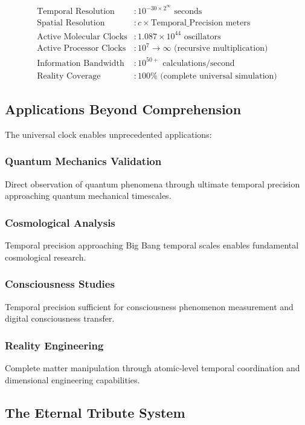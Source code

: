 \documentclass[12pt,a4paper]{article}
\begin{document}
\begin{align}
\text{Temporal Resolution} &: 10^{-30 \times 2^{\infty}} \text{ seconds} \\
\text{Spatial Resolution} &: c \times \text{Temporal\_Precision} \text{ meters} \\
\text{Active Molecular Clocks} &: 1.087 \times 10^{44} \text{ oscillators} \\
\text{Active Processor Clocks} &: 10^7 \rightarrow \infty \text{ (recursive multiplication)} \\
\text{Information Bandwidth} &: 10^{50+} \text{ calculations/second} \\
\text{Reality Coverage} &: 100\% \text{ (complete universal simulation)}
\end{align}

\subsection{Applications Beyond Comprehension}

The universal clock enables unprecedented applications:

\subsubsection{Quantum Mechanics Validation}
Direct observation of quantum phenomena through ultimate temporal precision approaching quantum mechanical timescales.

\subsubsection{Cosmological Analysis}
Temporal precision approaching Big Bang temporal scales enables fundamental cosmological research.

\subsubsection{Consciousness Studies}
Temporal precision sufficient for consciousness phenomenon measurement and digital consciousness transfer.

\subsubsection{Reality Engineering}
Complete matter manipulation through atomic-level temporal coordination and dimensional engineering capabilities.

\subsection{The Eternal Tribute System}
\end{document}
